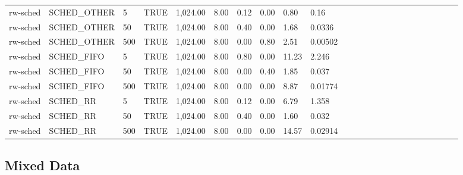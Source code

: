 \documentclass{article}
\begin{document}
\begin{table}[H]
{\begin{tabular}{llllllllllllllllllllllll}
rw-sched & SCHED\_OTHER & 5                   & TRUE          & 1,024.00      & 8.00      & 0.12        & 0.00      & 0.80      & 0.16             &  &  &  &  &  &  &  &  &  &  &  &  &  &  \\
rw-sched & SCHED\_OTHER & 50                  & TRUE          & 1,024.00      & 8.00      & 0.40        & 0.00      & 1.68      & 0.0336           &  &  &  &  &  &  &  &  &  &  &  &  &  &  \\
rw-sched & SCHED\_OTHER & 500                 & TRUE          & 1,024.00      & 8.00      & 0.00        & 0.80      & 2.51      & 0.00502          &  &  &  &  &  &  &  &  &  &  &  &  &  &  \\
rw-sched & SCHED\_FIFO  & 5                   & TRUE          & 1,024.00      & 8.00      & 0.80        & 0.00      & 11.23     & 2.246            &  &  &  &  &  &  &  &  &  &  &  &  &  &  \\
rw-sched & SCHED\_FIFO  & 50                  & TRUE          & 1,024.00      & 8.00      & 0.00        & 0.40      & 1.85      & 0.037            &  &  &  &  &  &  &  &  &  &  &  &  &  &  \\
rw-sched & SCHED\_FIFO  & 500                 & TRUE          & 1,024.00      & 8.00      & 0.00        & 0.00      & 8.87      & 0.01774          &  &  &  &  &  &  &  &  &  &  &  &  &  &  \\
rw-sched & SCHED\_RR    & 5                   & TRUE          & 1,024.00      & 8.00      & 0.12        & 0.00      & 6.79      & 1.358            &  &  &  &  &  &  &  &  &  &  &  &  &  &  \\
rw-sched & SCHED\_RR    & 50                  & TRUE          & 1,024.00      & 8.00      & 0.40        & 0.00      & 1.60      & 0.032            &  &  &  &  &  &  &  &  &  &  &  &  &  &  \\
rw-sched & SCHED\_RR    & 500                 & TRUE          & 1,024.00      & 8.00      & 0.00        & 0.00      & 14.57     & 0.02914          &  &  &  &  &  &  &  &  &  &  &  &  &  &
\end{tabular}
}
\end{table}

\subsection{Mixed Data}
\end{document}
